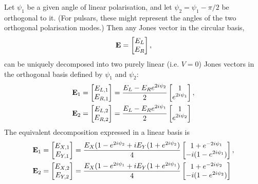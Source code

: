 \documentclass{book}
\begin{document}
Let $\psi_1$ be a given angle of linear polarisation, and let $\psi_2 = \psi_1 - \pi/2$ be orthogonal to it.
(For pulsars, these might represent the angles of the two orthogonal polarisation modes.)
Then any Jones vector in the circular basis,
\[
    {\bf E} = \begin{bmatrix} E_L \\ E_R \end{bmatrix},
\]
can be uniquely decomposed into two purely linear (i.e. $V=0$) Jones vectors in the orthogonal basis defined by $\psi_1$ and $\psi_2$:
\begin{align}
    {\bf E}_1
         = \begin{bmatrix} E_{L,1} \\ E_{R,1} \end{bmatrix}
        &= \frac{E_L - E_R e^{2i\psi_2}}{2} \begin{bmatrix} 1 \\ e^{2i\psi_1} \end{bmatrix}, \\
    {\bf E}_2
         = \begin{bmatrix} E_{L,2} \\ E_{R,2} \end{bmatrix}
        &= \frac{E_L - E_R e^{2i\psi_1}}{2} \begin{bmatrix} 1 \\ e^{2i\psi_2} \end{bmatrix}
\end{align}
The equivalent decomposition expressed in a linear basis is
\begin{align}
    {\bf E}_1
         = \begin{bmatrix} E_{X,1} \\ E_{Y,1} \end{bmatrix}
        &= \frac{E_X(1 - e^{2i\psi_2} + iE_Y(1 + e^{2i\psi_2})}{4}
           \begin{bmatrix} 1 + e^{-2i\psi_1} \\ -i(1 - e^{2i\psi_1}) \end{bmatrix}, \\
    {\bf E}_2
         = \begin{bmatrix} E_{X,2} \\ E_{Y,2} \end{bmatrix}
        &= \frac{E_X(1 - e^{2i\psi_1} + iE_Y(1 + e^{2i\psi_1})}{4}
           \begin{bmatrix} 1 + e^{-2i\psi_2} \\ -i(1 - e^{2i\psi_2}) \end{bmatrix}
\end{align}
\end{document}
